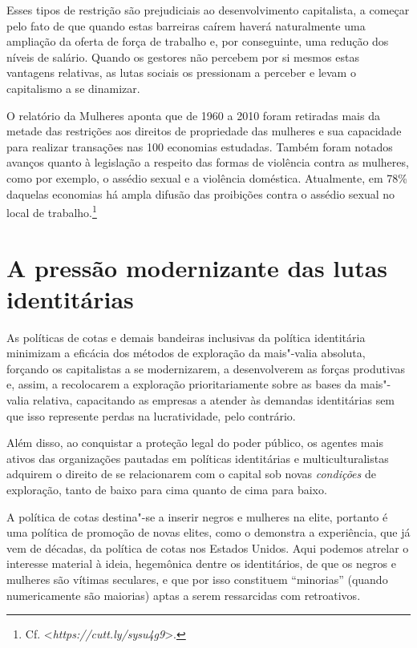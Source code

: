 Esses tipos de restrição são prejudiciais ao desenvolvimento
capitalista, a começar pelo fato de que quando estas barreiras caírem
haverá naturalmente uma ampliação da oferta de força de trabalho e, por
conseguinte, uma redução dos níveis de salário. Quando os gestores não
percebem por si mesmos estas vantagens relativas, as lutas sociais os
pressionam a perceber e levam o capitalismo a se dinamizar.

O relatório da  Mulheres aponta que de 1960 a 2010 foram retiradas
mais da metade das restrições aos direitos de propriedade das mulheres e
sua capacidade para realizar transações nas 100 economias estudadas.
Também foram notados avanços quanto à legislação a respeito das formas
de violência contra as mulheres, como por exemplo, o assédio sexual e a
violência doméstica. Atualmente, em 78\% daquelas economias há ampla
difusão das proibições contra o assédio sexual no local de
trabalho.\footnote{Cf. \textless{}\emph{https://cutt.ly/sysu4g9}\textgreater{}.}

\chapter{A pressão modernizante das lutas identitárias}

As políticas de cotas e demais bandeiras inclusivas da política
identitária minimizam a eficácia dos métodos de exploração da mais"-valia
absoluta, forçando os capitalistas a se modernizarem, a desenvolverem as
forças produtivas e, assim, a recolocarem a exploração prioritariamente
sobre as bases da mais"-valia relativa, capacitando as empresas a atender
às demandas identitárias sem que isso represente perdas na
lucratividade, pelo contrário.

Além disso, ao conquistar a proteção legal do poder público, os agentes
mais ativos das organizações pautadas em políticas identitárias e
multiculturalistas adquirem o direito de se relacionarem com o capital
sob novas \emph{condições} de exploração, tanto de baixo para cima
quanto de cima para baixo.

A política de cotas destina"-se a inserir negros e mulheres na elite,
portanto é uma política de promoção de novas elites, como o demonstra a
experiência, que já vem de décadas, da política de cotas nos Estados
Unidos. Aqui podemos atrelar o interesse material à ideia, hegemônica
dentre os identitários, de que os negros e mulheres são vítimas
seculares, e que por isso constituem ``minorias'' (quando numericamente
são maiorias) aptas a serem ressarcidas com retroativos.

